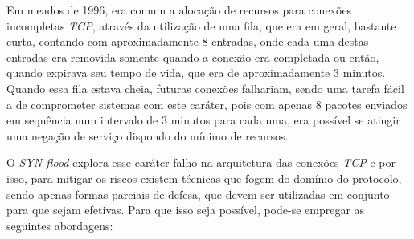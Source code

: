 Em meados de 1996, era comum a alocação de recursos para conexões incompletas \textit{TCP}, através da utilização de uma fila, que era em geral, bastante curta, contando com aproximadamente 8 entradas, onde cada uma destas entradas era removida somente quando a conexão era completada ou então, quando expirava seu tempo de vida, que era de aproximadamente 3 minutos. Quando essa fila estava cheia, futuras conexões falhariam, sendo uma tarefa fácil a de comprometer sistemas com este caráter, pois com apenas 8 pacotes enviados em sequência num intervalo de 3 minutos para cada uma, era possível se atingir uma negação de serviço dispondo do mínimo de recursos.

O \textit{SYN flood} explora esse caráter falho na arquitetura das conexões \textit{TCP} e por isso, para mitigar os riscos existem técnicas que fogem do domínio do protocolo, sendo apenas formas parciais de defesa, que devem ser utilizadas em conjunto para que sejam efetivas. Para que isso seja possível, pode-se empregar as seguintes abordagens:
